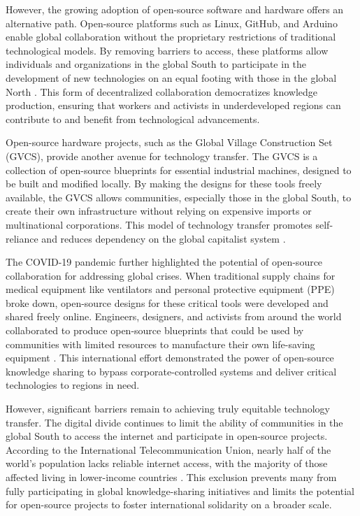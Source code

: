 \begin{refsection}
However, the growing adoption of open-source software and hardware offers an alternative path. Open-source platforms such as Linux, GitHub, and Arduino enable global collaboration without the proprietary restrictions of traditional technological models. By removing barriers to access, these platforms allow individuals and organizations in the global South to participate in the development of new technologies on an equal footing with those in the global North \cite[pp.~58-61]{stallmanfreesoftware}. This form of decentralized collaboration democratizes knowledge production, ensuring that workers and activists in underdeveloped regions can contribute to and benefit from technological advancements.

Open-source hardware projects, such as the Global Village Construction Set (GVCS), provide another avenue for technology transfer. The GVCS is a collection of open-source blueprints for essential industrial machines, designed to be built and modified locally. By making the designs for these tools freely available, the GVCS allows communities, especially those in the global South, to create their own infrastructure without relying on expensive imports or multinational corporations. This model of technology transfer promotes self-reliance and reduces dependency on the global capitalist system \cite[pp.~12-16]{pearcegvcset}.

The COVID-19 pandemic further highlighted the potential of open-source collaboration for addressing global crises. When traditional supply chains for medical equipment like ventilators and personal protective equipment (PPE) broke down, open-source designs for these critical tools were developed and shared freely online. Engineers, designers, and activists from around the world collaborated to produce open-source blueprints that could be used by communities with limited resources to manufacture their own life-saving equipment \cite[pp.~47-50]{pearceopensourcecovid}. This international effort demonstrated the power of open-source knowledge sharing to bypass corporate-controlled systems and deliver critical technologies to regions in need.

However, significant barriers remain to achieving truly equitable technology transfer. The digital divide continues to limit the ability of communities in the global South to access the internet and participate in open-source projects. According to the International Telecommunication Union, nearly half of the world’s population lacks reliable internet access, with the majority of those affected living in lower-income countries \cite[pp.~210-213]{internationaltelecomstats}. This exclusion prevents many from fully participating in global knowledge-sharing initiatives and limits the potential for open-source projects to foster international solidarity on a broader scale.


\end{refsection}
